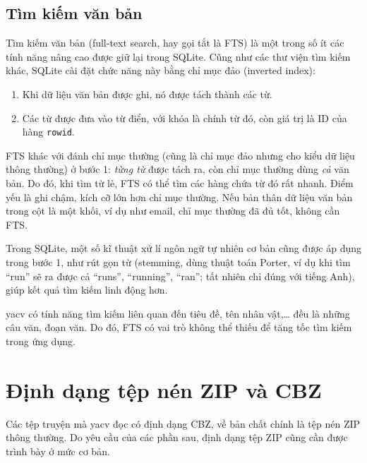 \documentclass[../../thesis]{subfiles}
\begin{document}
\subsection{Tìm kiếm văn bản}

Tìm kiếm văn bản (full-text search, hay gọi tắt là FTS) là một trong số ít các
tính năng nâng cao được giữ lại trong SQLite. Cũng như các thư viện tìm kiếm
khác, SQLite cài đặt chức năng này bằng chỉ mục đảo (inverted index):

\begin{enumerate}
    \item
        Khi dữ liệu văn bản được ghi, nó được tách thành các từ.
    \item
        Các từ được đưa vào từ điển, với khóa là chính từ đó, còn giá trị là ID
        của hàng \texttt{rowid}.
\end{enumerate}

FTS khác với đánh chỉ mục thường (cũng là chỉ mục đảo nhưng cho kiểu dữ liệu
thông thường) ở bước 1: \emph{từng từ} được tách ra, còn chỉ mục thường dùng
\emph{cả} văn bản. Do đó, khi tìm từ lẻ, FTS có thể tìm các hàng chứa từ đó rất
nhanh. Điểm yếu là ghi chậm, kích cỡ lớn hơn chỉ mục thường. Nếu bản thân dữ
liệu văn bản trong cột là một khối, ví dụ như email, chỉ mục thường đã đủ tốt,
không cần FTS.

Trong SQLite, một số kĩ thuật xử lí ngôn ngữ tự nhiên cơ bản cũng được áp dụng
trong bước 1, như rút gọn từ (stemming, dùng thuật toán Porter, ví dụ khi tìm
``run'' sẽ ra được cả ``runs'', ``running'', ``ran''; tất nhiên chỉ đúng với
tiếng Anh), giúp kết quả tìm kiếm linh động hơn.

yacv có tính năng tìm kiếm liên quan đến tiêu đề, tên nhân vật,\ldots{} đều là
những câu văn, đoạn văn. Do đó, FTS có vai trò không thể thiếu để tăng tốc tìm
kiếm trong ứng dụng.



\section{Định dạng tệp nén ZIP và CBZ}

Các tệp truyện mà yacv đọc có định dạng CBZ, về bản chất chính là tệp nén ZIP
thông thường. Do yêu cầu của các phần sau, định dạng tệp ZIP cũng cần được trình
bày ở mức cơ bản.
\end{document}
